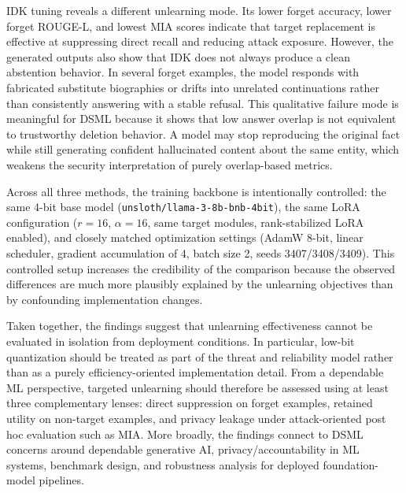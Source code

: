 \documentclass[conference]{IEEEtran}
\begin{document}
IDK tuning reveals a different unlearning mode. Its lower forget accuracy, lower forget ROUGE-L, and lowest MIA scores indicate that target replacement is effective at suppressing direct recall and reducing attack exposure. However, the generated outputs also show that IDK does not always produce a clean abstention behavior. In several forget examples, the model responds with fabricated substitute biographies or drifts into unrelated continuations rather than consistently answering with a stable refusal. This qualitative failure mode is meaningful for DSML because it shows that low answer overlap is not equivalent to trustworthy deletion behavior. A model may stop reproducing the original fact while still generating confident hallucinated content about the same entity, which weakens the security interpretation of purely overlap-based metrics.

Across all three methods, the training backbone is intentionally controlled: the same 4-bit base model (\texttt{unsloth/llama-3-8b-bnb-4bit}), the same LoRA configuration ($r=16$, $\alpha=16$, same target modules, rank-stabilized LoRA enabled), and closely matched optimization settings (AdamW 8-bit, linear scheduler, gradient accumulation of 4, batch size 2, seeds 3407/3408/3409). This controlled setup increases the credibility of the comparison because the observed differences are much more plausibly explained by the unlearning objectives than by confounding implementation changes.

Taken together, the findings suggest that unlearning effectiveness cannot be evaluated in isolation from deployment conditions. In particular, low-bit quantization should be treated as part of the threat and reliability model rather than as a purely efficiency-oriented implementation detail. From a dependable ML perspective, targeted unlearning should therefore be assessed using at least three complementary lenses: direct suppression on forget examples, retained utility on non-target examples, and privacy leakage under attack-oriented post hoc evaluation such as MIA. More broadly, the findings connect to DSML concerns around dependable generative AI, privacy/accountability in ML systems, benchmark design, and robustness analysis for deployed foundation-model pipelines.
\end{document}
